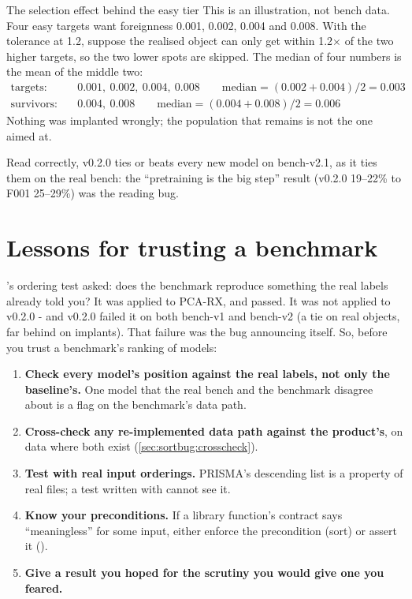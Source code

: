 \begin{worked}[label={we:sortbug:selection}]{The selection effect behind the easy tier}
This is an illustration, not bench data\tagA. Four easy targets want foreignness 0.001, 0.002, 0.004 and 0.008.
With the tolerance at 1.2, suppose the realised object can only get within 1.2$\times$ of the two higher targets, so
the two lower spots are skipped. The median of four numbers is the mean of the middle two:
\begin{align*}
\text{targets:}\quad & 0.001,\ 0.002,\ 0.004,\ 0.008 \qquad \text{median} = (0.002 + 0.004)/2 = 0.003\\
\text{survivors:}\quad & 0.004,\ 0.008 \qquad \text{median} = (0.004 + 0.008)/2 = 0.006
\end{align*}
Nothing was implanted wrongly; the population that remains is not the one aimed at.
\end{worked}

\begin{keypoint}
Read correctly, v0.2.0 ties or beats every new model on bench-v2.1, as it ties them on the real bench: the
``pretraining is the big step'' result (v0.2.0 19--22\% to F001 25--29\%) was the reading bug.
\end{keypoint}

\section{Lessons for trusting a benchmark}\label{sec:sortbug:lessons}

's ordering test asked: does the benchmark reproduce something the real labels already told
you? It was applied to PCA-RX, and passed. It was not applied to v0.2.0 - and v0.2.0 failed it on both bench-v1
and bench-v2 (a tie on real objects, far behind on implants). That failure was the bug announcing itself. So,
before you trust a benchmark's ranking of models:
\begin{enumerate}
\item \textbf{Check every model's position against the real labels, not only the baseline's.} One model that
  the real bench and the benchmark disagree about is a flag on the benchmark's data path.
\item \textbf{Cross-check any re-implemented data path against the product's}, on data where both exist
  (\cref{sec:sortbug:crosscheck}).
\item \textbf{Test with real input orderings.} PRISMA's descending list is a property of real files; a test
  written with \code{[500, 600, 700]} cannot see it.
\item \textbf{Know your preconditions.} If a library function's contract says ``meaningless'' for some input,
  either enforce the precondition (sort) or assert it ().
\item \textbf{Give a result you hoped for the scrutiny you would give one you feared.}
\end{enumerate}

